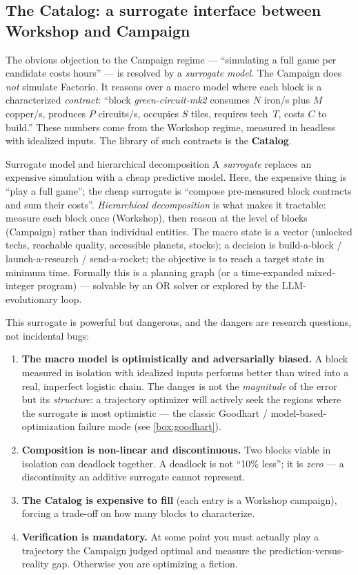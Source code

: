 \documentclass[11pt,a4paper]{article}
\begin{document}
\subsection{The Catalog: a surrogate interface between Workshop and Campaign}

The obvious objection to the Campaign regime --- ``simulating a full game per
candidate costs hours'' --- is resolved by a \emph{surrogate model}. The Campaign
does \emph{not} simulate Factorio. It reasons over a macro model where each block
is a characterized \emph{contract}: ``block \emph{green-circuit-mk2} consumes
$N$ iron/s plus $M$ copper/s, produces $P$ circuits/s, occupies $S$ tiles,
requires tech~$T$, costs $C$ to build.'' These numbers come from the Workshop
regime, measured in headless with idealized inputs. The library of such contracts
is the \textbf{Catalog}.

\begin{notionbox}{Surrogate model and hierarchical decomposition}
A \emph{surrogate} replaces an expensive simulation with a cheap predictive
model. Here, the expensive thing is ``play a full game''; the cheap surrogate is
``compose pre-measured block contracts and sum their costs''. \emph{Hierarchical
decomposition} is what makes it tractable: measure each block once (Workshop),
then reason at the level of blocks (Campaign) rather than individual entities.
The macro state is a vector (unlocked techs, reachable quality, accessible
planets, stocks); a decision is build-a-block / launch-a-research / send-a-rocket;
the objective is to reach a target state in minimum time. Formally this is a
planning graph (or a time-expanded mixed-integer program) --- solvable by an OR
solver or explored by the LLM-evolutionary loop.
\end{notionbox}

This surrogate is powerful but dangerous, and the dangers are research questions,
not incidental bugs:

\begin{enumerate}
\item \textbf{The macro model is optimistically and adversarially biased.} A
  block measured in isolation with idealized inputs performs better than wired
  into a real, imperfect logistic chain. The danger is not the \emph{magnitude}
  of the error but its \emph{structure}: a trajectory optimizer will actively
  seek the regions where the surrogate is most optimistic --- the classic
  Goodhart / model-based-optimization failure mode (see \cref{box:goodhart}).
\item \textbf{Composition is non-linear and discontinuous.} Two blocks viable in
  isolation can deadlock together. A deadlock is not ``10\% less''; it is
  \emph{zero} --- a discontinuity an additive surrogate cannot represent.
\item \textbf{The Catalog is expensive to fill} (each entry is a Workshop
  campaign), forcing a trade-off on how many blocks to characterize.
\item \textbf{Verification is mandatory.} At some point you must actually play a
  trajectory the Campaign judged optimal and measure the prediction-versus-reality
  gap. Otherwise you are optimizing a fiction.
\end{enumerate}
\end{document}
